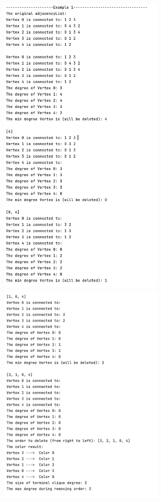 \documentclass{article}
\begin{document}
\begin{enumerate}
\begin{center}
        \includegraphics[width=0.6\textwidth]{Ex11.png}
        \includegraphics[width=0.6\textwidth]{Ex12.png}

\end{center}
\end{enumerate}
\end{document}
